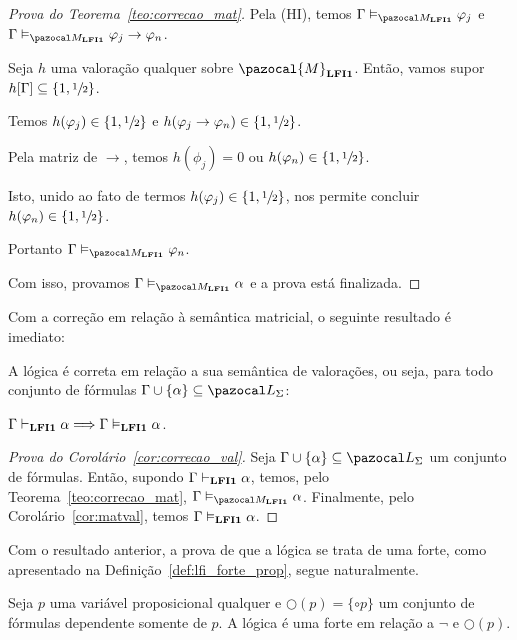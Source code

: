\begin{proof}[Prova do Teorema~\ref{teo:correcao_mat}]
            Pela (HI), temos $\Gamma \conmat \phi_{j}$ e $\Gamma \conmat \phi_{j} \to \phi_{n}$.

            Seja $h$ uma valoração qualquer sobre $\pazocal{M}_{\lfium{}}$. Então, vamos supor $h[\Gamma] \subseteq \{1, \sfrac{1}{2}{}\}$. 
            
            Temos $h(\varphi_{j}) \in \{1, \sfrac{1}{2}{}\}$ e $h(\varphi_{j} \to \varphi_{n}) \in \{1,\sfrac{1}{2}{}\}$. 
            
            Pela matriz de $\to$, temos $h(\phi_{j}) = 0$ ou $h(\varphi_{n}) \in \{1,\sfrac{1}{2}{}\}$. 
            
            Isto, unido ao fato de termos $h(\varphi_{j}) \in \{1,\sfrac{1}{2}{}\}$, nos permite concluir $h(\varphi_{n}) \in \{1,\sfrac{1}{2}{}\}$. 
            
            Portanto $\Gamma \conmat \phi_{n}$.

            \noindent Com isso, provamos $\Gamma \conmat \alpha$ e a prova está finalizada. \qedhere

        \end{proof}

        Com a correção em relação à semântica matricial, o seguinte resultado é imediato:


        \begin{corolario}\label{cor:correcao_val}
            A lógica {\normalfont\lfium{}} é correta em relação a sua semântica de valorações, ou seja, para todo conjunto de fórmulas $\Gamma \cup \{\alpha\} \subseteq \ling{}$:

            \centering
            {\normalfont{} $\Gamma \vdash_{{\normalfont\textbf{LFI1}}{}} \alpha \Longrightarrow \Gamma \vDash_{{\normalfont\textbf{LFI1}}{}} \alpha$.}
        \end{corolario}

        \begin{proof}[Prova do Corolário~\ref{cor:correcao_val}]
            Seja $\Gamma \cup \{\alpha\} \subseteq \ling{}$ um conjunto de fórmulas. Então, supondo $\Gamma \vdash_{{\normalfont\textbf{LFI1}}{}} \alpha$, temos, pelo Teorema~\ref{teo:correcao_mat}, $\Gamma \conmat \alpha$. Finalmente, pelo Corolário~\ref{cor:matval}, temos $\Gamma \vDash_{{\normalfont\textbf{LFI1}}{}} \alpha$.
        \end{proof}

        Com o resultado anterior, a prova de que a lógica \lfium{} se trata de uma \lfi{} forte, como apresentado na Definição~\ref{def:lfi_forte_prop}, segue naturalmente.

        \begin{corolario}\label{cor:lfi_forte}
            Seja $p$ uma variável proposicional qualquer e $\bigcirc(p) = \{\circ p\}$ um conjunto de fórmulas dependente somente de $p$. A lógica \lfium{} é uma \lfi{} forte em relação a $\neg$ e $\bigcirc(p)$.
        \end{corolario}

